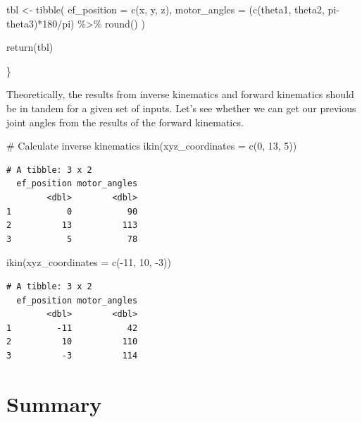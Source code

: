 \documentclass[
  letterpaper,
  DIV=11,
  numbers=noendperiod]{scrreprt}
\newenvironment{Shaded}{\begin{snugshade}}{\end{snugshade}}
\newcommand{\AttributeTok}[1]{\textcolor[rgb]{0.40,0.45,0.13}{#1}}
\newcommand{\CommentTok}[1]{\textcolor[rgb]{0.37,0.37,0.37}{#1}}
\newcommand{\DecValTok}[1]{\textcolor[rgb]{0.68,0.00,0.00}{#1}}
\newcommand{\FunctionTok}[1]{\textcolor[rgb]{0.28,0.35,0.67}{#1}}
\newcommand{\NormalTok}[1]{\textcolor[rgb]{0.00,0.23,0.31}{#1}}
\newcommand{\OtherTok}[1]{\textcolor[rgb]{0.00,0.23,0.31}{#1}}
\newcommand{\SpecialCharTok}[1]{\textcolor[rgb]{0.37,0.37,0.37}{#1}}
\begin{document}
\begin{Shaded}
\begin{Highlighting}[]
\NormalTok{  tbl }\OtherTok{\textless{}{-}} \FunctionTok{tibble}\NormalTok{(}
    \AttributeTok{ef\_position =} \FunctionTok{c}\NormalTok{(x, y, z),}
    \AttributeTok{motor\_angles =}\NormalTok{ (}\FunctionTok{c}\NormalTok{(theta1, theta2, pi}\SpecialCharTok{{-}}\NormalTok{theta3)}\SpecialCharTok{*}\DecValTok{180}\SpecialCharTok{/}\NormalTok{pi) }\SpecialCharTok{\%\textgreater{}\%} \FunctionTok{round}\NormalTok{()}
\NormalTok{  )}
  
  \FunctionTok{return}\NormalTok{(tbl)}
  
\NormalTok{\}}
\end{Highlighting}
\end{Shaded}

Theoretically, the results from inverse kinematics and forward
kinematics should be in tandem for a given set of inputs. Let's see
whether we can get our previous joint angles from the results of the
forward kinematics.

\begin{Shaded}
\begin{Highlighting}[]
\CommentTok{\# Calculate inverse kinematics}
\FunctionTok{ikin}\NormalTok{(}\AttributeTok{xyz\_coordinates =} \FunctionTok{c}\NormalTok{(}\DecValTok{0}\NormalTok{, }\DecValTok{13}\NormalTok{, }\DecValTok{5}\NormalTok{))}
\end{Highlighting}
\end{Shaded}

\begin{verbatim}
# A tibble: 3 x 2
  ef_position motor_angles
        <dbl>        <dbl>
1           0           90
2          13          113
3           5           78
\end{verbatim}

\begin{Shaded}
\begin{Highlighting}[]
\FunctionTok{ikin}\NormalTok{(}\AttributeTok{xyz\_coordinates =} \FunctionTok{c}\NormalTok{(}\SpecialCharTok{{-}}\DecValTok{11}\NormalTok{, }\DecValTok{10}\NormalTok{, }\SpecialCharTok{{-}}\DecValTok{3}\NormalTok{))}
\end{Highlighting}
\end{Shaded}

\begin{verbatim}
# A tibble: 3 x 2
  ef_position motor_angles
        <dbl>        <dbl>
1         -11           42
2          10          110
3          -3          114
\end{verbatim}

\hypertarget{summary}{%
\section{Summary}\label{summary}}
\end{document}
